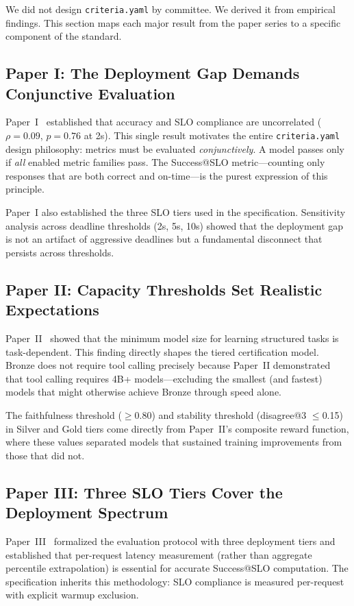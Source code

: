 \documentclass[11pt]{article}
\newcommand{\criteriayaml}{\texttt{criteria.yaml}}
\begin{document}
We did not design \criteriayaml{} by committee. We derived it from empirical findings. This section maps each major result from the paper series to a specific component of the standard.

\subsection{Paper I: The Deployment Gap Demands Conjunctive Evaluation}

Paper~I~\citep{maloney2025deploymentgap} established that accuracy and SLO compliance are uncorrelated ($\rho = 0.09$, $p = 0.76$ at 2s). This single result motivates the entire \criteriayaml{} design philosophy: metrics must be evaluated \emph{conjunctively}. A model passes only if \emph{all} enabled metric families pass. The Success@SLO metric---counting only responses that are both correct and on-time---is the purest expression of this principle.

Paper~I also established the three SLO tiers used in the specification. Sensitivity analysis across deadline thresholds (2s, 5s, 10s) showed that the deployment gap is not an artifact of aggressive deadlines but a fundamental disconnect that persists across thresholds.

\subsection{Paper II: Capacity Thresholds Set Realistic Expectations}

Paper~II~\citep{maloney2025capacity} showed that the minimum model size for learning structured tasks is task-dependent. This finding directly shapes the tiered certification model. Bronze does not require tool calling precisely because Paper~II demonstrated that tool calling requires 4B+ models---excluding the smallest (and fastest) models that might otherwise achieve Bronze through speed alone.

The faithfulness threshold ($\geq$0.80) and stability threshold (disagree@3 $\leq$0.15) in Silver and Gold tiers come directly from Paper~II's composite reward function, where these values separated models that sustained training improvements from those that did not.

\subsection{Paper III: Three SLO Tiers Cover the Deployment Spectrum}

Paper~III~\citep{maloney2025agentslobench} formalized the evaluation protocol with three deployment tiers and established that per-request latency measurement (rather than aggregate percentile extrapolation) is essential for accurate Success@SLO computation. The specification inherits this methodology: SLO compliance is measured per-request with explicit warmup exclusion.
\end{document}
